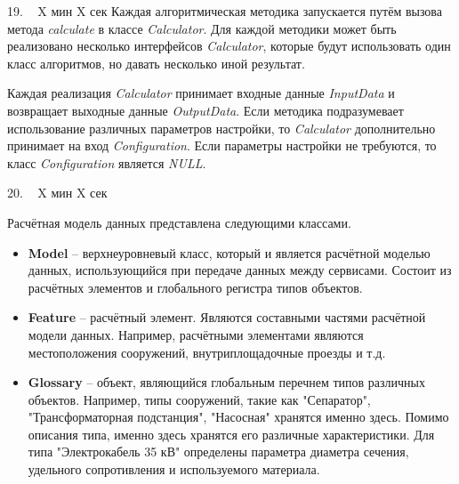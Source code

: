 \documentclass[a4paper,14pt]{extarticle}
\begin{document}
    19. ~ X мин X сек
    Каждая алгоритмическая методика запускается путём вызова метода \textit{calculate}
    в классе \textit{Calculator}.
    Для каждой методики может быть реализовано несколько интерфейсов \textit{Calculator},
    которые будут использовать один класс алгоритмов, но давать несколько иной результат.

    Каждая реализация \textit{Calculator} принимает входные данные \textit{InputData}
    и возвращает выходные данные \textit{OutputData}.
    Если методика подразумевает использование различных параметров настройки, то \textit{Calculator} дополнительно
    принимает на вход \textit{Configuration}. Если параметры настройки не требуются, то класс \textit{Configuration}
    является \textit{NULL}.

    20. ~ X мин X сек

    Расчётная модель данных представлена следующими классами.
    \begin{itemize}
        \item \textbf{Model} -- верхнеуровневый класс, который и является расчётной моделью данных, использующийся
        при передаче данных между сервисами. Состоит из расчётных элементов и глобального регистра типов объектов.
        \item {
            \textbf{Feature} -- расчётный элемент. Являются составными частями расчётной модели данных. Например, расчётными
            элементами являются местоположения сооружений, внутриплощадочные проезды и т.д.
        }
        \item {
            \textbf{Glossary} -- объект, являющийся глобальным перечнем типов различных объектов.
            Например, типы сооружений, такие как "Сепаратор", "Трансформаторная подстанция", "Насосная" хранятся именно
            здесь. Помимо описания типа, именно здесь хранятся его различные характеристики. Для типа "Электрокабель 35 кВ"
            определены параметра диаметра сечения, удельного сопротивления и используемого материала.
        }
\end{itemize}
\end{document}
